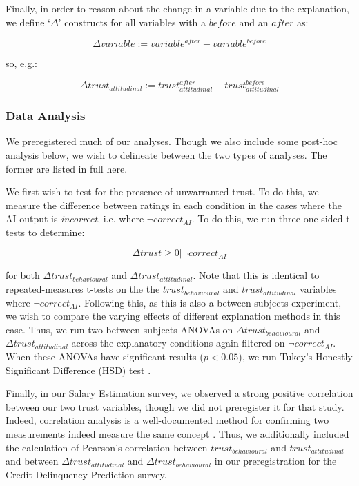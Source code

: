 Finally, in order to reason about the change in a variable due to the explanation, we define `$\Delta$' constructs for all variables with a $before$ and an $after$ as:

\begin{equation}
    \Delta variable := variable^{after} - variable^{before}
\end{equation}

\noindent so, e.g.:

\begin{equation}
    \Delta trust_{attitudinal} := trust_{attitudinal}^{after} - trust_{attitudinal}^{before}
\end{equation}

\subsubsection{Data Analysis}
We preregistered much of our analyses. Though we also include some post-hoc analysis below, we wish to delineate between the two types of analyses. The former are listed in full here.

We first wish to test for the presence of unwarranted trust. To do this, we measure the difference between ratings in each condition in the cases where the AI output is \textit{incorrect}, i.e. where $\neg correct_{AI}$. To do this, we run three one-sided t-tests \cite{caldwell_power_nodate} to determine:

\begin{equation}
    \Delta trust \geq 0 | \neg correct_{AI}
\end{equation}

\noindent for both $\Delta trust_{behavioural}$ and $\Delta trust_{attitudinal}$. Note that this is identical to repeated-measures t-tests on the the $trust_{behavioural}$ and $trust_{attitudinal}$ variables where $\neg correct_{AI}$. Following this, as this is also a between-subjects experiment, we wish to compare the varying effects of different explanation methods in this case. Thus, we run two between-subjects ANOVAs \cite{caldwell_power_nodate} on $\Delta trust_{behavioural}$ and $\Delta trust_{attitudinal}$ across the explanatory conditions again filtered on $\neg correct_{AI}$. When these ANOVAs have significant results ($p < 0.05$), we run Tukey's Honestly Significant Difference (HSD) test \cite{caldwell_power_nodate}.

Finally, in our Salary Estimation survey, we observed a strong positive correlation between our two trust variables, though we did not preregister it for that study. Indeed, correlation analysis is a well-documented method for confirming two measurements indeed measure the same concept \cite{westen_quantifying_2003, morata-ramirez_construct_2013}. Thus, we additionally included the calculation of Pearson's correlation between $trust_{behavioural}$ and $trust_{attitudinal}$ and between $\Delta trust_{attitudinal}$ and $\Delta trust_{behavioural}$ in our preregistration for the Credit Delinquency Prediction survey. 

